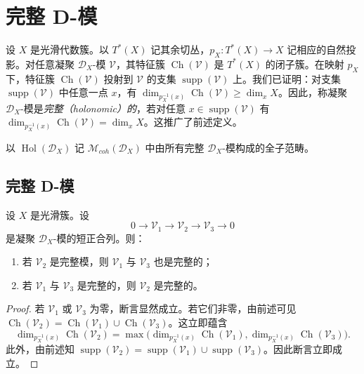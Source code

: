 \chapter{完整 D-模}

设 $X$ 是光滑代数簇。以 $T^*(X)$ 记其余切丛，$p_X:T^*(X)\to X$ 记相应的自然投影。对任意凝聚
$\mathcal{D}_X$-模 $\mathcal{V}$，其特征簇 $\operatorname{Ch}(\mathcal{V})$ 是 $T^*(X)$ 的闭子簇。在映射 $p_X$ 下，特征簇
$\operatorname{Ch}(\mathcal{V})$ 投射到 $\mathcal{V}$ 的支集 $\operatorname{supp}(\mathcal{V})$ 上。我们已证明：对支集
$\operatorname{supp}(\mathcal{V})$ 中任意一点 $x$，有
$\dim_{p_X^{-1}(x)}\operatorname{Ch}(\mathcal{V})\ge\dim_xX$。因此，称凝聚 $\mathcal{D}_X$-模是\emph{完整（holonomic）的}，若对任意 $x\in\operatorname{supp}(\mathcal{V})$ 有
$\dim_{p_X^{-1}(x)}\operatorname{Ch}(\mathcal{V})=\dim_xX$。这推广了前述定义。

以 $\operatorname{Hol}(\mathcal{D}_X)$ 记 $\mathcal{M}_{coh}(\mathcal{D}_X)$ 中由所有完整 $\mathcal{D}_X$-模构成的全子范畴。

\section{完整 D-模}

\begin{theorem}\label{thm:5.1.1}
设 $X$ 是光滑簇。设
$$0\longrightarrow\mathcal{V}_1\longrightarrow\mathcal{V}_2\longrightarrow\mathcal{V}_3\longrightarrow0$$
是凝聚 $\mathcal{D}_X$-模的短正合列。则：
\begin{enumerate}[label=(\roman*)]
  \item 若 $\mathcal{V}_2$ 是完整模，则 $\mathcal{V}_1$ 与 $\mathcal{V}_3$ 也是完整的；
  \item 若 $\mathcal{V}_1$ 与 $\mathcal{V}_3$ 是完整的，则 $\mathcal{V}_2$ 是完整的。
\end{enumerate}
\end{theorem}

\begin{proof}
若 $\mathcal{V}_1$ 或 $\mathcal{V}_3$ 为零，断言显然成立。若它们非零，由前述可见
$\operatorname{Ch}(\mathcal{V}_2)=\operatorname{Ch}(\mathcal{V}_1)\cup\operatorname{Ch}(\mathcal{V}_3)$。这立即蕴含
$$\dim_{p_X^{-1}(x)}\operatorname{Ch}(\mathcal{V}_2)
=\max\bigl(\dim_{p_X^{-1}(x)}\operatorname{Ch}(\mathcal{V}_1),
\dim_{p_X^{-1}(x)}\operatorname{Ch}(\mathcal{V}_3)\bigr).$$
此外，由前述知 $\operatorname{supp}(\mathcal{V}_2)=\operatorname{supp}(\mathcal{V}_1)\cup\operatorname{supp}(\mathcal{V}_3)$。因此断言立即成立。
\end{proof}

